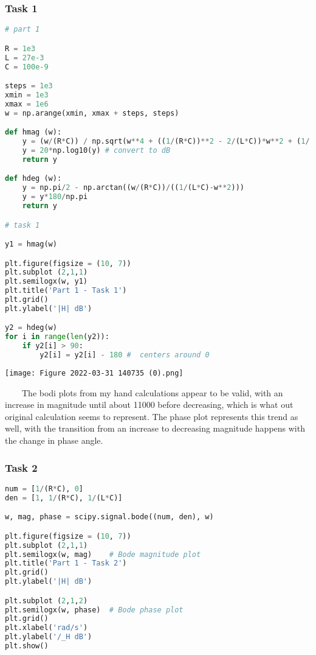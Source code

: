 \documentclass[11pt,a4]{article}
\begin{document}
\subsubsection{Task 1}

\begin{lstlisting}[language=Python]
# part 1

R = 1e3
L = 27e-3
C = 100e-9

steps = 1e3
xmin = 1e3
xmax = 1e6
w = np.arange(xmin, xmax + steps, steps)

def hmag (w):
    y = (w/(R*C)) / np.sqrt(w**4 + ((1/(R*C))**2 - 2/(L*C))*w**2 + (1/(L*C))**2)
    y = 20*np.log10(y) # convert to dB
    return y

def hdeg (w):
    y = np.pi/2 - np.arctan((w/(R*C))/((1/(L*C)-w**2)))
    y = y*180/np.pi
    return y

# task 1

y1 = hmag(w)

plt.figure(figsize = (10, 7))
plt.subplot (2,1,1)
plt.semilogx(w, y1)
plt.title('Part 1 - Task 1')
plt.grid()
plt.ylabel('|H| dB')

y2 = hdeg(w)
for i in range(len(y2)):
    if y2[i] > 90:
        y2[i] = y2[i] - 180 #  centers around 0
\end{lstlisting}

\texttt{[image: Figure 2022-03-31 140735 (0).png]}

\ \ \ \ The bodi plots from my hand calculations appear to be valid, with an increase in magnitude until about 11000 before decreasing, which is what out original calculation seems to represent. The phase plot represents this trend as well, with the transition from an increase to decreasing magnitude happens with the change in phase angle.

\subsubsection{Task 2}

\begin{lstlisting}[language=Python]
num = [1/(R*C), 0]
den = [1, 1/(R*C), 1/(L*C)]

w, mag, phase = scipy.signal.bode((num, den), w)

plt.figure(figsize = (10, 7))
plt.subplot (2,1,1)
plt.semilogx(w, mag)    # Bode magnitude plot
plt.title('Part 1 - Task 2')
plt.grid()
plt.ylabel('|H| dB')

plt.subplot (2,1,2)
plt.semilogx(w, phase)  # Bode phase plot
plt.grid()
plt.xlabel('rad/s')
plt.ylabel('/_H dB')
plt.show()
\end{lstlisting}
\end{document}
